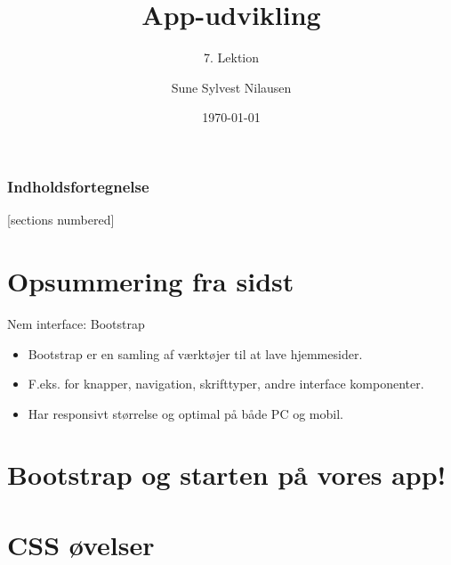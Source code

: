 \documentclass[10pt]{beamer}
\title{App-udvikling}
\subtitle{7. Lektion}
\date{\today}
\author{Sune Sylvest Nilausen}
\begin{document}

\maketitle

\begin{frame}
  \frametitle{Indholdsfortegnelse}
  [sections numbered]
  \tableofcontents[hideallsubsections]
\end{frame}

\section{Opsummering fra sidst}

\begin{frame}{Nem interface: Bootstrap}
	\begin{itemize}
		\item Bootstrap er en samling af værktøjer til at lave hjemmesider.
		\pause
		\item F.eks. for knapper, navigation, skrifttyper, andre interface komponenter.
		\pause
		\item Har responsivt størrelse og optimal på både PC og mobil.
	\end{itemize}
\end{frame}


\section{Bootstrap og starten på vores app!}

\section{CSS øvelser}


 
\end{document}
